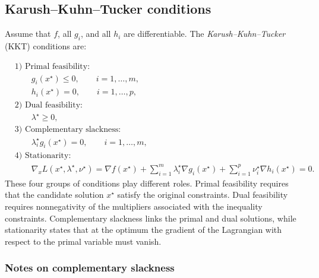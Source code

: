 \subsection{Karush--Kuhn--Tucker conditions}

Assume that \(f\), all \(g_i\), and all \(h_i\) are differentiable. The \emph{Karush--Kuhn--Tucker} (KKT) conditions are:

\begin{align*}
&\text{1) Primal feasibility:} \\
&\qquad g_i(x^\star)\le 0, \qquad i=1,\dots,m,\\
&\qquad h_i(x^\star)=0, \qquad i=1,\dots,p,\\[0.5em]
&\text{2) Dual feasibility:} \\
&\qquad \lambda^\star \ge 0,\\[0.5em]
&\text{3) Complementary slackness:} \\
&\qquad \lambda_i^\star g_i(x^\star)=0,\qquad i=1,\dots,m,\\[0.5em]
&\text{4) Stationarity:} \\
&\qquad \nabla_x L(x^\star,\lambda^\star,\nu^\star)
=
\nabla f(x^\star)
+
\sum_{i=1}^m \lambda_i^\star \nabla g_i(x^\star)
+
\sum_{i=1}^p \nu_i^\star \nabla h_i(x^\star)
=0.
\end{align*}
These four groups of conditions play different roles. Primal feasibility requires that the candidate solution \(x^\star\) satisfy the original constraints. Dual feasibility requires nonnegativity of the multipliers associated with the inequality constraints. Complementary slackness links the primal and dual solutions, while stationarity states that at the optimum the gradient of the Lagrangian with respect to the primal variable must vanish.

\subsubsection{Notes on complementary slackness}

